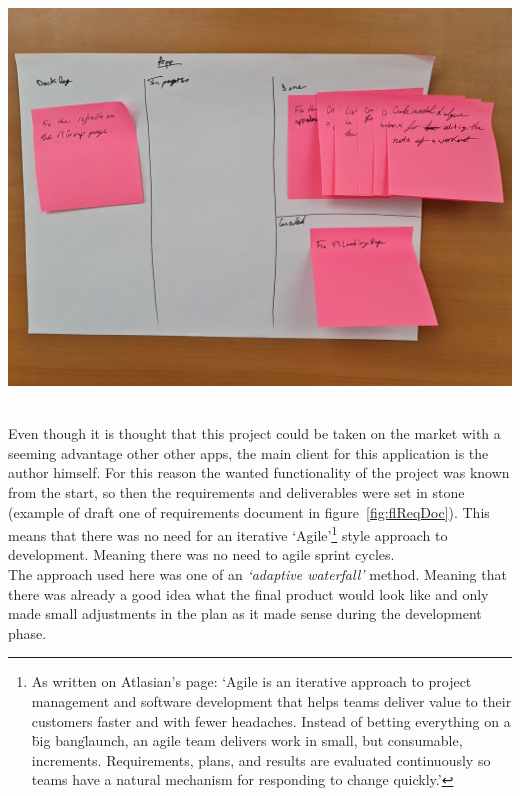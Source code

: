 \documentclass{article}
\begin{document}
\begin{multicols}{2}
\begingroup
\centering
\includegraphics[width=0.9\linewidth]{./appendix/assets/img/frontendBacklog.jpg}
~\label{fig:frontendKanban}
\endgroup

Even though it is thought that this project could be taken on the market with a seeming advantage other other apps, the main client for this application is the author himself. For this reason the wanted functionality of the project was known from the start, so then the requirements and deliverables were set in stone (example of draft one of requirements document in figure~\ref{fig:flReqDoc}). This means that there was no need for an iterative `Agile'\footnote{As written on Atlasian's page\cite{agile}: `Agile is an iterative approach to project management and software development that helps teams deliver value to their customers faster and with fewer headaches. Instead of betting everything on a \"big bang\" launch, an agile team delivers work in small, but consumable, increments. Requirements, plans, and results are evaluated continuously so teams have a natural mechanism for responding to change quickly.'} style approach to development. Meaning there was no need to agile sprint cycles.\\
The approach used here was one of an \textit{`adaptive waterfall'} method. Meaning that there was already a good idea what the final product would look like and only made small adjustments in the plan as it made sense during the development phase.\\


\end{multicols}
\end{document}
